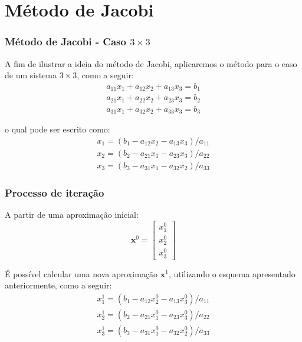 \documentclass{beamer}
\theoremstyle{mystyle}
\begin{document}
\section{Método de Jacobi}

\begin{frame}
	\frametitle{Método de Jacobi - Caso $ 3\times3 $}
	A fim de ilustrar a ideia do método de Jacobi, aplicaremos o método para o caso de um sistema $ 3\times3 $, como a seguir:
	\begin{gather*}
		a_{11} x_1 + a_{12} x_2 + a_{13} x_3 = b_1 \\
		a_{21} x_1 + a_{22} x_2 + a_{23} x_3 = b_2 \\
		a_{31} x_1 + a_{32} x_2 + a_{33} x_3 = b_3
	\end{gather*}  

	o qual pode ser escrito como:
	\begin{gather*}
		x_1 = ( b_1 - a_{12} x_2 - a_{13} x_3 ) / a_{11}\\
		x_2 = ( b_2 - a_{21} x_1 - a_{23} x_3 ) / a_{22}\\
		x_3 = ( b_3 - a_{31} x_1 - a_{32} x_2 ) / a_{33}
	\end{gather*}
\end{frame}

\begin{frame}
	\frametitle{Processo de iteração}
	A partir de uma aproximação inicial:
	\begin{equation*}
		\mathbf{x}^{0} = \left[
		\begin{array}{c}
			x_{1}^{0}  \\
			x_{2}^{0} \\
			x_{3}^{0}
		\end{array}
		\right]
	\end{equation*}

	É possível calcular uma nova aproximação $ \mathbf{x}^{1} $, utilizando o esquema apresentado anteriormente, como a seguir:
	\begin{gather*}
		x_1^{1} = ( b_1 - a_{12} x_2^{0} - a_{13} x_3^{0} ) / a_{11}\\
		x_2^{1} = ( b_2 - a_{21} x_1^{0} - a_{23} x_3^{0} ) / a_{22}\\
		x_3^{1} = ( b_3 - a_{31} x_1^{0} - a_{32} x_2^{0} ) / a_{33}
	\end{gather*}
\end{frame}
\end{document}
